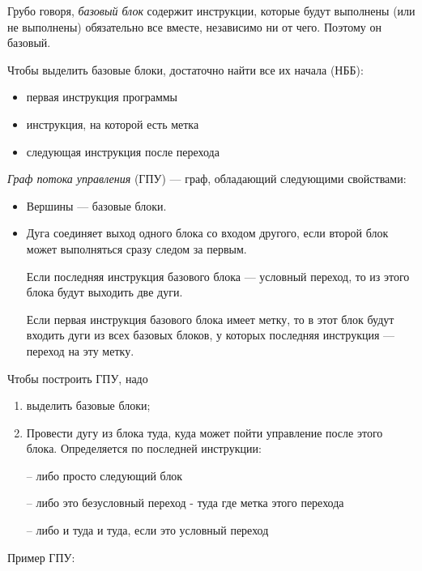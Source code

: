 Грубо говоря, \textit{базовый блок} содержит инструкции, которые будут выполнены (или не выполнены) обязательно все вместе, независимо ни от чего. Поэтому он базовый.

Чтобы выделить базовые блоки, достаточно найти все их начала (НББ):
\begin{itemize}
    \item первая инструкция программы
    \item инструкция, на которой есть метка
    \item следующая инструкция после перехода
\end{itemize}

\textit{Граф потока управления} (ГПУ) --- граф, обладающий следующими свойствами:
\begin{itemize}
    \item Вершины --- базовые блоки.
    \item Дуга соединяет выход одного блока со входом другого, если второй блок может выполняться сразу следом за первым.
    
    Если последняя инструкция базового блока --- условный переход, то из этого блока будут выходить две дуги. 
    
    Если первая инструкция базового блока имеет метку, то в этот блок будут входить дуги из всех базовых блоков, у которых последняя инструкция --- переход на эту метку.
\end{itemize}

Чтобы построить ГПУ, надо 
\begin{enumerate}
    \item выделить базовые блоки;
    \item Провести дугу из блока туда, куда может пойти управление после этого блока. Определяется по последней инструкции: 
    \item[--] либо просто следующий блок
    \item[--] либо это безусловный переход - туда где метка этого перехода
    \item[--] либо и туда и туда, если это условный переход
\end{enumerate}

Пример ГПУ:

